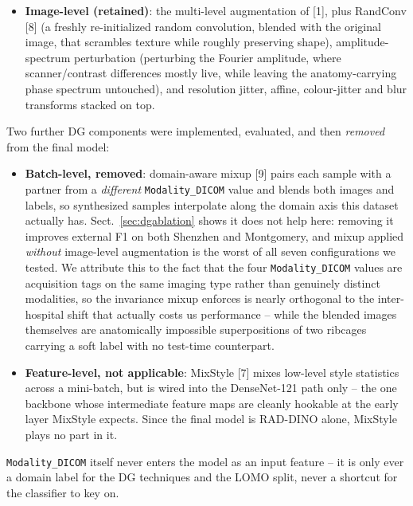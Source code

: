 \documentclass[runningheads]{llncs}
\begin{document}
\begin{itemize}
\item \textbf{Image-level (retained)}: the multi-level augmentation of
  [1], plus RandConv [8] (a freshly re-initialized
  random convolution, blended with the original image, that scrambles
  texture while roughly preserving shape), amplitude-spectrum perturbation
  (perturbing the Fourier amplitude, where scanner/contrast differences
  mostly live, while leaving the anatomy-carrying phase spectrum
  untouched), and resolution jitter, affine, colour-jitter and blur
  transforms stacked on top.
\end{itemize}

Two further DG components were implemented, evaluated, and then
\emph{removed} from the final model:

\begin{itemize}
\item \textbf{Batch-level, removed}: domain-aware mixup [9] pairs
  each sample with a partner from a \emph{different}
  \texttt{Modality\_DICOM} value and blends both images and labels, so
  synthesized samples interpolate along the domain axis this dataset
  actually has. Sect.~\ref{sec:dgablation} shows it does not help here:
  removing it improves external F1 on both Shenzhen and Montgomery, and
  mixup applied \emph{without} image-level augmentation is the worst of all
  seven configurations we tested. We attribute this to the fact that the
  four \texttt{Modality\_DICOM} values are acquisition tags on the same
  imaging type rather than genuinely distinct modalities, so the invariance
  mixup enforces is nearly orthogonal to the inter-hospital shift that
  actually costs us performance -- while the blended images themselves are
  anatomically impossible superpositions of two ribcages carrying a soft
  label with no test-time counterpart.
\item \textbf{Feature-level, not applicable}: MixStyle [7] mixes
  low-level style statistics across a mini-batch, but is wired into the
  DenseNet-121 path only -- the one backbone whose intermediate feature
  maps are cleanly hookable at the early layer MixStyle expects. Since the
  final model is RAD-DINO alone, MixStyle plays no part in it.
\end{itemize}

\texttt{Modality\_DICOM} itself never enters the model as an input feature
-- it is only ever a domain label for the DG techniques and the LOMO split,
never a shortcut for the classifier to key on.
\end{document}
